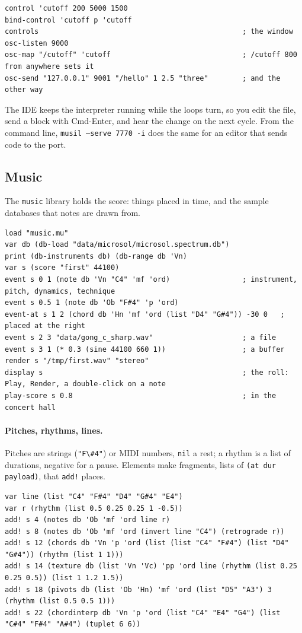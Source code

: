 \documentclass[11pt,a4paper]{article}
\newcommand{\musil}[1]{\lstinline[style=musilinline]{#1}}
\begin{document}
\begin{lstlisting}
control 'cutoff 200 5000 1500
bind-control 'cutoff p 'cutoff
controls                                                ; the window
osc-listen 9000
osc-map "/cutoff" 'cutoff                               ; /cutoff 800 from anywhere sets it
osc-send "127.0.0.1" 9001 "/hello" 1 2.5 "three"        ; and the other way
\end{lstlisting}

The IDE keeps the interpreter running while the loops turn, so you edit the file, send a
block with Cmd-Enter, and hear the change on the next cycle. From the command line,
\texttt{musil --serve 7770 -i} does the same for an editor that sends code to the port.

\subsection{Music}

The \texttt{music} library holds the score: things placed in time, and the sample
databases that notes are drawn from.

\begin{lstlisting}
load "music.mu"
var db (db-load "data/microsol/microsol.spectrum.db")
print (db-instruments db) (db-range db 'Vn)
var s (score "first" 44100)
event s 0 1 (note db 'Vn "C4" 'mf 'ord)                 ; instrument, pitch, dynamics, technique
event s 0.5 1 (note db 'Ob "F#4" 'p 'ord)
event-at s 1 2 (chord db 'Hn 'mf 'ord (list "D4" "G#4")) -30 0   ; placed at the right
event s 2 3 "data/gong_c_sharp.wav"                     ; a file
event s 3 1 (* 0.3 (sine 44100 660 1))                  ; a buffer
render s "/tmp/first.wav" "stereo"
display s                                               ; the roll: Play, Render, a double-click on a note
play-score s 0.8                                        ; in the concert hall
\end{lstlisting}

\paragraph{Pitches, rhythms, lines.} Pitches are strings (\musil{"F\#4"}) or MIDI numbers,
\musil{nil} a rest; a rhythm is a list of durations, negative for a pause. Elements make
fragments, lists of \musil{(at dur payload)}, that \musil{add!} places.

\begin{lstlisting}
var line (list "C4" "F#4" "D4" "G#4" "E4")
var r (rhythm (list 0.5 0.25 0.25 1 -0.5))
add! s 4 (notes db 'Ob 'mf 'ord line r)
add! s 8 (notes db 'Ob 'mf 'ord (invert line "C4") (retrograde r))
add! s 12 (chords db 'Vn 'p 'ord (list (list "C4" "F#4") (list "D4" "G#4")) (rhythm (list 1 1)))
add! s 14 (texture db (list 'Vn 'Vc) 'pp 'ord line (rhythm (list 0.25 0.25 0.5)) (list 1 1.2 1.5))
add! s 18 (pivots db (list 'Ob 'Hn) 'mf 'ord (list "D5" "A3") 3 (rhythm (list 0.5 0.5 1)))
add! s 22 (chordinterp db 'Vn 'p 'ord (list "C4" "E4" "G4") (list "C#4" "F#4" "A#4") (tuplet 6 6))
\end{lstlisting}
\end{document}
